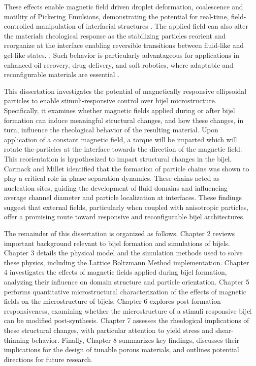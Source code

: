 These effects enable magnetic field driven droplet deformation, coalescence and 
motility of Pickering Emulsions, demonstrating the potential for real-time, field-controlled manipulation of interfacial structures \cite{melle_pickering_2005, tham_magnetophoresis_2021}.
The applied field can also alter the materials rheological response as the stabilizing particles reorient and reorganize at the interface
enabling reversible transitions between fluid-like and gel-like states. \cite{qiao_magnetorheological_2012, melle_pickering_2005}. 
Such behavior is particularly advantageous for applications in enhanced oil recovery, drug delivery, and soft robotics, where adaptable and 
reconfigurable materials are essential \cite{tham_magnetophoresis_2021}.


This dissertation investigates the potential of magnetically responsive ellipsoidal particles to enable stimuli-responsive control over bijel microstructure. Specifically, it examines whether magnetic 
fields applied during or after bijel formation can induce meaningful structural changes, and how these changes, in turn, influence the rheological behavior of the resulting material. Upon application of
a constant magnetic field, a torque will be imparted which will rotate the particles at the interface towards the direction of the magnetic field. This reorientation is hypothesized to impart
structural changes in the bijel. Carmack and Millet identified that the formation of particle chains was shown to play a critical role in phase separation dynamics. These chains acted as 
nucleation sites, guiding the development of fluid domains and influencing average channel diameter and particle localization at interfaces. These findings suggest that external fields, 
particularly when coupled with anisotropic particles, offer a promising route toward responsive and reconfigurable bijel architectures.

The remainder of this dissertation is organized as follows. Chapter 2 reviews important background relevant to bijel formation and simulations of bijels.
Chapter 3 details the physical model and the simulation methods used to solve these physics, including the Lattice Boltzmann Method implementation. Chapter 4 investigates the effects 
of magnetic fields applied during bijel formation, analyzing their influence on domain structure and particle orientation. Chapter 5 performs quantitative microstructural characterization of the effects
of magnetic fields on the microstructure of bijels. Chapter 6 explores post-formation responsiveness, examining whether the microstructure of a stimuli responsive bijel can be modified
post-synthesis. Chapter 7 assesses the rheological implications of these structural changes, with particular attention to yield stress and shear-thinning behavior. Finally, Chapter 8 summarizes 
key findings, discusses their implications for the design of tunable porous materials, and outlines potential directions for future research.